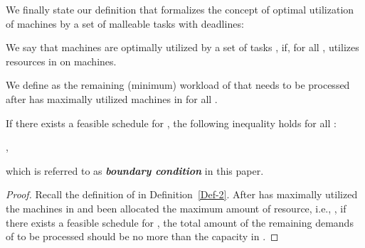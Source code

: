 \documentclass[10pt,journal,compsoc]{IEEEtran}
\begin{document}
We finally state our definition that formalizes the concept of optimal utilization of  machines by a set  of malleable tasks with deadlines:


\begin{definition}\label{Def-3}
We say that  machines are optimally utilized by a set of tasks , if, for all ,  utilizes  resources in  on  machines.
\end{definition}


We define  as the remaining (minimum) workload of  that needs to be processed after  has maximally utilized  machines in  for all .



\begin{lemma}\label{boundary-condition}
If there exists a feasible schedule for ,  the following inequality holds for all :
\begin{center}
,
\end{center}
which is referred to as \textbf{{\em boundary condition}} in this paper.
\end{lemma}
\begin{proof}Recall the definition of  in Definition~\ref{Def-2}. After  has maximally utilized the machines in  and been allocated the maximum amount of resource, i.e., , if there exists a feasible schedule for , the total amount of the remaining demands of  to be processed should be no more than the capacity  in .
\end{proof}
\end{document}
